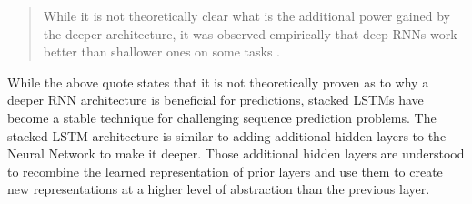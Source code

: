         \begin{quote}
            While it is not theoretically clear what is the additional power gained by the deeper architecture, it was observed empirically that deep RNNs work better than shallower ones on some tasks \cite{goldbergPrimerNeuralNetwork2016}.
        \end{quote}
        While the above quote states that it is not theoretically proven as to why a deeper RNN architecture is beneficial for predictions, stacked LSTMs have become a stable technique for challenging sequence prediction problems. The stacked LSTM architecture is similar to adding additional hidden layers to the Neural Network to make it deeper. Those additional hidden layers are understood to recombine the learned representation of prior layers and use them to create new representations at a higher level of abstraction than the previous layer.
